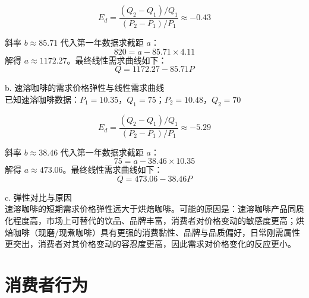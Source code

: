 \begin{enumerate}[label=\textbf{\arabic*.}, leftmargin=*]
			$$E_d = \frac{(Q_2-Q_1)/Q_1}{(P_2-P_1)/P_1}\approx -0.43$$

			斜率 $b \approx 85.71$
			代入第一年数据求截距 $a$：
			$$820 = a - 85.71 \times 4.11$$
			解得 $a \approx 1172.27$。最终线性需求曲线如下：
				$$Q = 1172.27 - 85.71P$$

			
			b. 速溶咖啡的需求价格弹性与线性需求曲线\\
			已知速溶咖啡数据：$P_1=10.35$，$Q_1=75$；$P_2=10.48$，$Q_2=70$

			$$E_d = \frac{(Q_2-Q_1)/Q_1}{(P_2-P_1)/P_1} \approx -5.29$$

			斜率 $b \approx 38.46$
			代入第一年数据求截距 $a$：
			$$75 = a - 38.46 \times 10.35$$
			解得 $a \approx 473.06$。最终线性需求曲线如下：
				$$Q = 473.06 - 38.46P$$

			c. 弹性对比与原因\\
			速溶咖啡的短期需求价格弹性远大于烘焙咖啡。可能的原因是：速溶咖啡产品同质化程度高，市场上可替代的饮品、品牌丰富，消费者对价格变动的敏感度更高；烘焙咖啡（现磨/现煮咖啡）具有更强的消费黏性、品牌与品质偏好，日常刚需属性更突出，消费者对其价格变动的容忍度更高，因此需求对价格变化的反应更小。
		\end{enumerate}
	\chapter{消费者行为}
	
